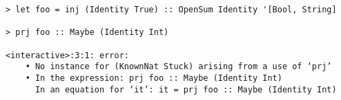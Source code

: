 \begin{repl}\begin{lstlisting}
> let foo = inj (Identity True) :: OpenSum Identity '[Bool, String]

> prj foo :: Maybe (Identity Int)

<interactive>:3:1: error:
    • No instance for (KnownNat Stuck) arising from a use of ‘prj’
    • In the expression: prj foo :: Maybe (Identity Int)
      In an equation for ‘it’: it = prj foo :: Maybe (Identity Int)\end{lstlisting}\end{repl}
